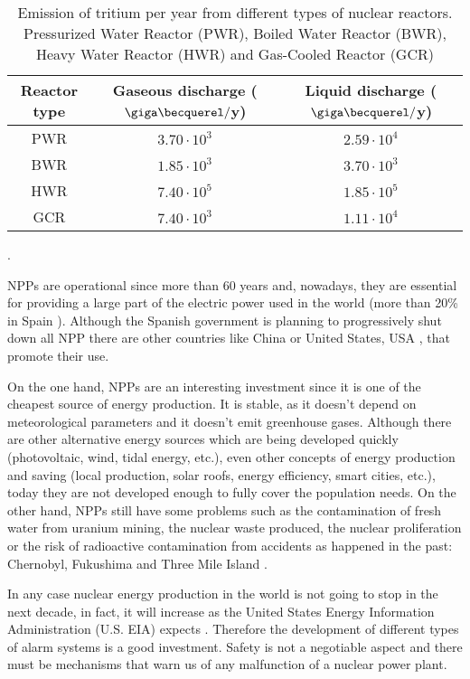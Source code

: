 \begin{table}[htbp]
\begin{center}
\begin{tabular}{|c|c|c|}
\hline
Reactor type & Gaseous discharge ($\giga\becquerel/$y) & Liquid discharge ($\giga\becquerel/$y) \\
\hline \hline \hline
PWR & $3.70\cdot 10^{3}$ & $2.59\cdot 10^{4}$ \\ \hline
BWR & $1.85\cdot 10^{3}$ & $3.70\cdot 10^{3}$ \\ \hline
HWR & $7.40\cdot 10^{5}$ & $1.85\cdot 10^{5}$ \\ \hline
GCR & $7.40\cdot 10^{3}$ & $1.11\cdot 10^{4}$ \\ \hline
\end{tabular}
\caption{Emission of tritium per year from different types of nuclear reactors. Pressurized Water Reactor (PWR), Boiled Water Reactor (BWR), Heavy Water Reactor (HWR) and Gas-Cooled Reactor (GCR) \cite{CommonEmissionTritium}}.
\label{tab:TritiumEmisionsNPPs}
\end{center}
\end{table} 

NPPs are operational since more than 60 years and, nowadays, they are essential for providing a large part of the electric power used in the world (more than 20\% in Spain \cite{PercentageEnergySpain}). Although the Spanish government is planning to progressively shut down all NPP there are other countries like China \cite{60ReactorsChina} or United States, USA \cite{35MillionsUSA}, that promote their use.

On the one hand, NPPs are an interesting investment since it is one of the cheapest source of energy production. It is stable, as it doesn't depend on  meteorological parameters and it doesn't emit greenhouse gases. Although there are other alternative energy sources which are being developed quickly  (photovoltaic, wind, tidal energy, etc.), even other concepts of energy production and saving (local production, solar roofs, energy efficiency, smart cities, etc.), today they are not developed enough to fully cover the population needs. On the other hand, NPPs still have some problems such as the contamination of fresh water from uranium mining, the nuclear waste produced, the nuclear proliferation or the risk of radioactive contamination from accidents as happened in the past: Chernobyl, Fukushima and Three Mile Island \cite{ThreeMileIsland}.

In any case nuclear energy production in the world is not going to stop in the next decade, in fact, it will increase as the United States Energy Information Administration (U.S. EIA) expects \cite{EIAOutlook}. Therefore the development of  different types of alarm systems is a good investment. Safety is not a negotiable aspect and there must be mechanisms that warn us of any malfunction of a nuclear power plant. 

